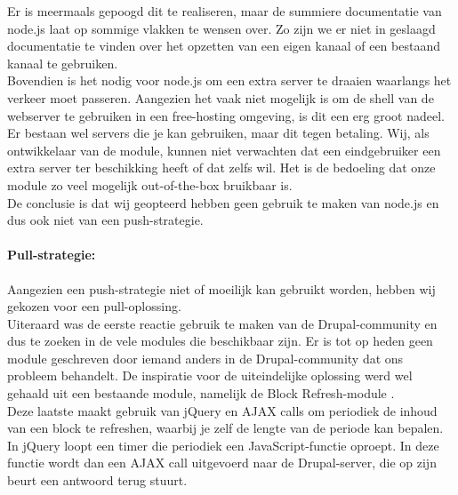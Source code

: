 Er is meermaals gepoogd dit te realiseren, maar de summiere documentatie van node.js laat op sommige vlakken te wensen over. Zo zijn we er niet in geslaagd documentatie te vinden over het opzetten van een eigen kanaal of een bestaand kanaal te gebruiken.\\
Bovendien is het nodig voor node.js om een extra server te draaien waarlangs het verkeer moet passeren. Aangezien het vaak niet mogelijk is om de shell van de webserver te gebruiken in een free-hosting omgeving, is dit een erg groot nadeel. Er bestaan wel servers die je kan gebruiken, maar dit tegen betaling. Wij, als ontwikkelaar van de module, kunnen niet verwachten dat een eindgebruiker een extra server ter beschikking heeft of dat zelfs wil. Het is de bedoeling dat onze module zo veel mogelijk out-of-the-box bruikbaar is.\\

De conclusie is dat wij geopteerd hebben geen gebruik te maken van node.js en dus ook niet van een push-strategie.

\paragraph{Pull-strategie: }

Aangezien een push-strategie niet of moeilijk kan gebruikt worden, hebben wij gekozen voor een pull-oplossing.\\

Uiteraard was de eerste reactie gebruik te maken van de Drupal-community en dus te zoeken in de vele modules die beschikbaar zijn. Er is tot op heden geen module geschreven door iemand anders in de Drupal-community dat ons probleem behandelt. De inspiratie voor de uiteindelijke oplossing werd wel gehaald uit een bestaande module, namelijk de Block Refresh-module \cite{blockRefreshModule}.\\
Deze laatste maakt gebruik van jQuery en AJAX calls om periodiek de inhoud van een block te refreshen, waarbij je zelf de lengte van de periode kan bepalen. In jQuery loopt een timer die periodiek een JavaScript-functie oproept. In deze functie wordt dan een AJAX call uitgevoerd naar de Drupal-server, die op zijn beurt een antwoord terug stuurt.\\

